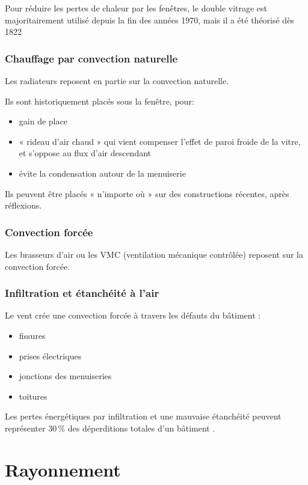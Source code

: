Pour réduire les pertes de chaleur par les fenêtres, le double vitrage est majoritairement utilisé depuis la fin des années 1970, mais il a été théorisé dès 1822 

\subsection*{Chauffage par convection naturelle}
Les radiateurs reposent en partie sur la convection naturelle.

Ils sont historiquement placés sous la fenêtre, pour:
\begin{itemize}
  \item gain de place 
  \item « rideau d'air chaud » qui vient compenser l'effet de paroi froide de la vitre, et s'oppose au flux d'air descendant
  \item évite la condensation autour de la menuiserie
\end{itemize}
Ils peuvent être placés « n'importe où » sur des constructions récentes, après réflexions.

\subsection*{Convection forcée}
Les brasseurs d'air ou les VMC (ventilation mécanique contrôlée) reposent sur la convection forcée.

\subsection*{Infiltration et étanchéité à l'air}
Le vent crée une convection forcée à travers les défauts du bâtiment :
\begin{itemize}
  \item fissures
  \item prises électriques
  \item jonctions des menuiseries
  \item toitures
\end{itemize}
Les pertes énergétiques par infiltration et une mauvaise étanchéité peuvent représenter 30\,\% des déperditions totales d'un bâtiment .

\chapter{Rayonnement}
\label{chap:rayonnement}


